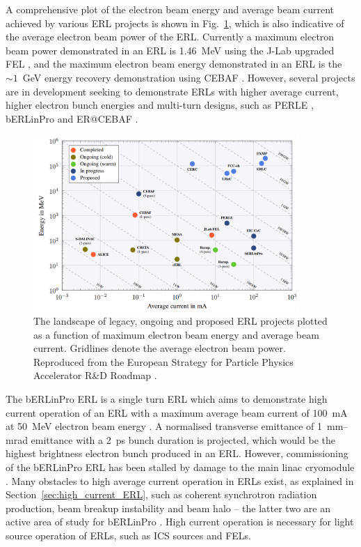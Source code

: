 \documentclass[../main.tex]{subfiles}
\begin{document}
A comprehensive plot of the electron beam energy and average beam current achieved by various ERL projects is shown in Fig.~\ref{fig:ERL_Landscape}, which is also indicative of the average electron beam power of the ERL. Currently a maximum electron beam power demonstrated in an ERL is 1.46~\si{\mega\electronvolt} using the J-Lab upgraded FEL \cite{neil2006jlab}, and the maximum electron beam energy demonstrated in an ERL is the $\sim1$~\si{\giga\electronvolt} energy recovery demonstration using CEBAF \cite{bogacz2003cebaf,tennant2003beam}. However, several projects are in development seeking to demonstrate ERLs with higher average current, higher electron bunch energies and multi-turn designs, such as PERLE \cite{angal2018perle}, bERLinPro \cite{kuske2012conceptual} and ER@CEBAF \cite{meot2016er}.

\begin{figure}[!h]
\centering
\includegraphics[width=0.9\textwidth]{Figures/CBETA_Multi-Pass_Commissioning/Tennant_ERL_Landscape.pdf}
\caption{The landscape of legacy, ongoing and proposed ERL projects plotted as a function of maximum electron beam energy and average beam current. Gridlines denote the average electron beam power. Reproduced from the European Strategy for Particle Physics
Accelerator R&D Roadmap \cite{adolphsen2022european}.}
\label{fig:ERL_Landscape}
\end{figure}

The bERLinPro ERL is a single turn ERL which aims to demonstrate high current operation of an ERL with a maximum average beam current of 100~\si{\milli\ampere} at 50~\si{\mega\electronvolt} electron beam energy \cite{kuske2012conceptual,neumann2018berlinpro}. A normalised transverse emittance of 1~\si{\milli\meter}--\si{\milli\radian} emittance with a 2~\si{\pico\second} bunch duration is projected, which would be the highest brightness electron bunch produced in an ERL. However, commissioning of the bERLinPro ERL has been stalled by damage to the main linac cryomodule \cite{neumann2018berlinpro}. Many obstacles to high average current operation in ERLs exist, as explained in Section~\ref{sec:high_current_ERL}, such as coherent synchrotron radiation production, beam breakup instability and beam halo -- the latter two are an active area of study for bERLinPro \cite{neumann2012status,hwang2019first}. High current operation is necessary for light source operation of ERLs, such as ICS sources and FELs.  
\end{document}
